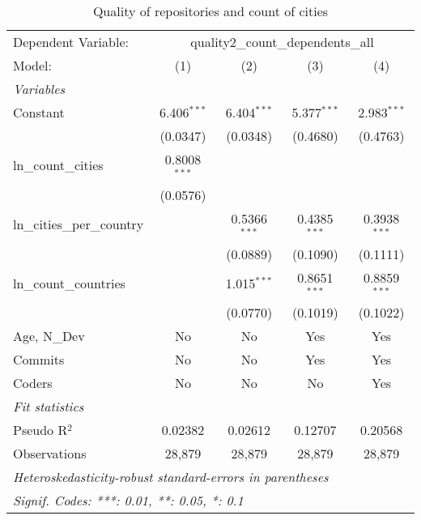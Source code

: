 \begin{table}[htbp]
   \caption{Quality of repositories and count of cities}
   \centering
   \begin{tabular}{lcccc}
      \tabularnewline \midrule \midrule
      Dependent Variable: & \multicolumn{4}{c}{quality2\_count\_dependents\_all}\\
      Model:                      & (1)            & (2)            & (3)            & (4)\\  
      \midrule
      \emph{Variables}\\
      Constant                    & 6.406$^{***}$  & 6.404$^{***}$  & 5.377$^{***}$  & 2.983$^{***}$\\   
                                  & (0.0347)       & (0.0348)       & (0.4680)       & (0.4763)\\   
      ln\_count\_cities           & 0.8008$^{***}$ &                &                &   \\   
                                  & (0.0576)       &                &                &   \\   
      ln\_cities\_per\_country    &                & 0.5366$^{***}$ & 0.4385$^{***}$ & 0.3938$^{***}$\\   
                                  &                & (0.0889)       & (0.1090)       & (0.1111)\\   
      ln\_count\_countries        &                & 1.015$^{***}$  & 0.8651$^{***}$ & 0.8859$^{***}$\\   
                                  &                & (0.0770)       & (0.1019)       & (0.1022)\\   
      Age, N\_Dev                 & No             & No             & Yes            & Yes\\  
      Commits                     & No             & No             & Yes            & Yes\\  
      Coders                      & No             & No             & No             & Yes\\  
      \midrule
      \emph{Fit statistics}\\
      Pseudo R$^2$                & 0.02382        & 0.02612        & 0.12707        & 0.20568\\  
      Observations                & 28,879         & 28,879         & 28,879         & 28,879\\  
      \midrule \midrule
      \multicolumn{5}{l}{\emph{Heteroskedasticity-robust standard-errors in parentheses}}\\
      \multicolumn{5}{l}{\emph{Signif. Codes: ***: 0.01, **: 0.05, *: 0.1}}\\
   \end{tabular}
\end{table}



